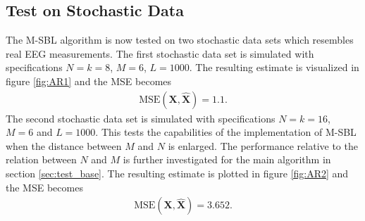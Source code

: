 \subsection{Test on Stochastic Data}\label{sec:testMsbl_stoch}
The M-SBL algorithm is now tested on two stochastic data sets which resembles real EEG measurements. 
The first stochastic data set is simulated with specifications $N = k = 8$, $M = 6$, $L=1000$. 
The resulting estimate is visualized in figure \ref{fig:AR1} and the MSE becomes 
\begin{align*}
\text{MSE}(\mathbf{X}, \hat{\mathbf{X}}) = 1.1.
\end{align*} 
The second stochastic data set is simulated with specifications $N = k =16$, $M = 6$ and $L=1000$. 
This tests the capabilities of the implementation of M-SBL when the distance between $M$ and $N$ is enlarged. 
The performance relative to the relation between $N$ and $M$ is further investigated for the main algorithm in section \ref{sec:test_base}.
The resulting estimate is plotted in figure \ref{fig:AR2} and the MSE becomes 
\begin{align*}
\text{MSE}(\mathbf{X}, \hat{\mathbf{X}}) = 3.652. 
\end{align*}  
